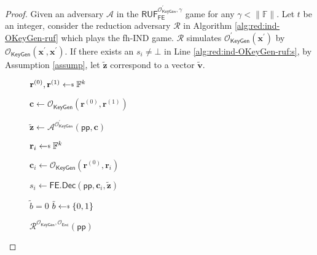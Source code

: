 \begin{proof}
Given an adversary $\mathcal{A}$ in the $\textsf{RUF}^{\mathcal{O}^\prime_{\textsf{KeyGen}}, \gamma}_{\textsf{FE}}$ game for any $\gamma < \|\mathbb{F}\|$. Let $t$ be an integer, consider the reduction adversary $\mathcal{R}$ in Algorithm \ref{alg:red:ind-OKeyGen-ruf} which plays the \textsf{fh-IND} game. $\mathcal{R}$ simulates $\mathcal{O}_\textsf{KeyGen}^\prime(\mathbf{x}^\prime)$ by $\mathcal{O}_\textsf{KeyGen}(\mathbf{x}^\prime, \mathbf{x}^\prime)$.
If there exists an $s_i \neq \bot$ in Line \ref{alg:red:ind-OKeyGen-ruf:s}, by Assumption \ref{assump}, let $\mathbf{\tilde{z}}$ correspond to a vector $\mathbf{\tilde{v}}$.

\begin{figure}[h]
\centering
	
	\begin{minipage}[t]{0.5\linewidth}
	\centering
	\begin{algorithm}[H]
	\caption{$\mathcal{R}^{\mathcal{O}_{\textsf{KeyGen}}, \mathcal{O}_{\textsf{Enc}}}(\textsf{pp})$}
	\label{alg:red:ind-OKeyGen-ruf}
	\begin{algorithmic}[1]
		\State $\mathbf{r}^{(0)}, \mathbf{r}^{(1)} \getsdollar \mathbb{F}^{k}$
		
		\State $\mathbf{c} \gets \mathcal{O}_{\textsf{KeyGen}}(\mathbf{r}^{(0)}, \mathbf{r}^{(1)})$ 

		\State ${\mathbf{\tilde{z}}} \gets {\mathcal{A}}^{\mathcal{O}^\prime_{\textsf{KeyGen}}} (\textsf{pp}, \mathbf{c})$

		
			\State $\mathbf{r}_i \getsdollar \mathbb{F}^{k}$

			\State $\mathbf{c}_i \gets \mathcal{O}_{\textsf{KeyGen}}(\mathbf{r}^{(0)}, \mathbf{r}_i)$

			\State $s_i \gets \textsf{FE.Dec}( \textsf{pp}, \mathbf{c}_i, \mathbf{\tilde{z}} )$ \label{alg:red:ind-OKeyGen-ruf:s}
	
		\EndFor	
		
		 \label{alg:red:ind-OKeyGen-ruf:verify}
			\State \Return $\tilde{b} = 0$
		\Else
			\State \Return $\tilde{b} \getsdollar \{0, 1\}$
		\EndIf

	\end{algorithmic}
	\end{algorithm}
	\end{minipage}
	
\end{figure}



\end{proof}
